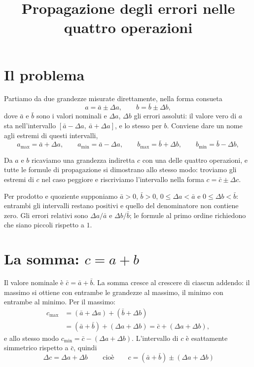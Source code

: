 \documentclass[11pt,a4paper]{article}
\title{Propagazione degli errori nelle quattro operazioni}
\author{}
\date{}
\begin{document}
\maketitle

\section*{Il problema}

Partiamo da due grandezze misurate direttamente, nella forma consueta
\begin{equation*}
a = \bar a \pm \Delta a, \qquad b = \bar b \pm \Delta b,
\end{equation*}
dove $\bar a$ e $\bar b$ sono i valori nominali e $\Delta a$, $\Delta b$ gli
errori assoluti: il valore vero di $a$ sta nell'intervallo
$[\bar a - \Delta a,\ \bar a + \Delta a]$, e lo stesso per $b$. Conviene dare
un nome agli estremi di questi intervalli,
\begin{equation*}
a_{\max} = \bar a + \Delta a, \qquad a_{\min} = \bar a - \Delta a, \qquad
b_{\max} = \bar b + \Delta b, \qquad b_{\min} = \bar b - \Delta b,
\end{equation*}

Da $a$ e $b$ ricaviamo una grandezza indiretta $c$ con una delle quattro
operazioni, e tutte le formule di propagazione si dimostrano allo stesso modo:
troviamo gli estremi di $c$ nel caso peggiore e riscriviamo l'intervallo nella
forma $c = \bar c \pm \Delta c$.

Per prodotto e quoziente supponiamo $\bar a > 0$, $\bar b > 0$,
$0 \leq \Delta a < \bar a$ e $0 \leq \Delta b < \bar b$: entrambi gli
intervalli restano positivi e quello del denominatore non contiene zero.
Gli errori relativi sono $\Delta a/\bar a$ e $\Delta b/\bar b$;
le formule al primo ordine richiedono che siano piccoli rispetto a $1$.

\section*{La somma: $c = a + b$}

Il valore nominale è $\bar c = \bar a + \bar b$. La somma cresce al crescere di
ciascun addendo: il massimo si ottiene con entrambe le grandezze al massimo, il
minimo con entrambe al minimo. Per il massimo:
\begin{align*}
c_{\max} &= (\bar a + \Delta a) + (\bar b + \Delta b)\\
&= (\bar a + \bar b) + (\Delta a + \Delta b)
= \bar c + (\Delta a + \Delta b),
\end{align*}
e allo stesso modo $c_{\min} = \bar c - (\Delta a + \Delta b)$. L'intervallo di
$c$ è esattamente simmetrico rispetto a $\bar c$, quindi
\begin{equation*}
\boxed{\,\Delta c = \Delta a + \Delta b\,}
\qquad\text{cioè}\qquad
c = (\bar a + \bar b) \pm (\Delta a + \Delta b)
\end{equation*}
\end{document}
